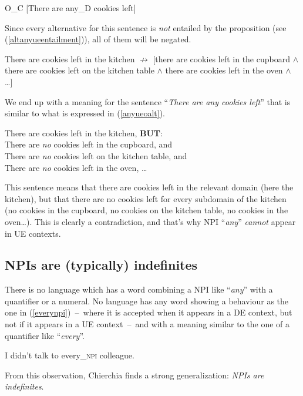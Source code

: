 \documentclass[a4paper,11pt]{article}
\newcommand{\reff}[1]{(\ref{#1})}
\newcommand{\exs}[2][]{\begin{exe}\ex #1 \begin{xlist}#2\end{xlist}\end{exe}}
\begin{document}
\begin{exe}
  \ex\label{anyueo} O_C [There are any_D cookies left]
\end{exe}
%
Since every alternative for this sentence is \emph{not} entailed by the proposition (see \reff{altanyueentailment}), all of them will be negated.

\begin{exe}
	\ex\label{altanyueentailment} There are cookies left in the kitchen $\nrightarrow$ [there are cookies left in the cupboard $\wedge$ there are cookies left on the kitchen table $\wedge$ there are cookies left in the oven $\wedge$ \ldots{}]
\end{exe}
%
We end up with a meaning for the sentence \enquote{\emph{There are any cookies left}} that is similar to what is expressed in \reff{anyueoalt}.

\begin{exe}
	\ex\label{anyueoalt} There are cookies left in the kitchen, \textbf{BUT}:\\
						 There are \emph{no} cookies left in the cupboard, and\\
						 There are \emph{no} cookies left on the kitchen table, and\\
						 There are \emph{no} cookies left in the oven, \ldots{}
\end{exe}
%
This sentence means that there are cookies left in the relevant domain (here the kitchen), but that there are no cookies left for every subdomain of the kitchen (no cookies in the cupboard, no cookies on the kitchen table, no cookies in the oven\ldots{}). This is clearly a contradiction, and that's why NPI \enquote{\emph{any}} \emph{cannot} appear in UE contexts.


\subsection{NPIs are (typically) indefinites}
There is no language which has a word combining a NPI like \enquote{\emph{any}} with a quantifier or a numeral. No language has any word showing a behaviour as the one in \reff{everynpi}~--~where it is accepted when it appears in a DE context, but not if it appears in a UE context~--~and with a meaning similar to the one of a quantifier like \enquote{\emph{every}}.

\exs[\label{everynpi}]{
  \ex{*}{I talked to every_{\textsc{npi}} colleague.}
  \ex I didn't talk to every_{\textsc{npi}} colleague.
}

From this observation, Chierchia finds a strong generalization: \emph{NPIs are indefinites}.
\end{document}
